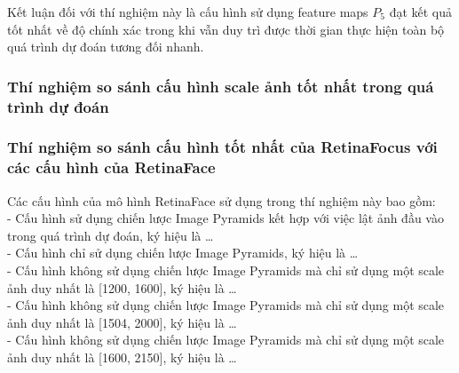 {    \noindent
    Kết luận đối với thí nghiệm này là cấu hình sử dụng feature maps  ${P}_{5}$ đạt kết quả tốt nhất về độ chính xác trong khi vẫn duy trì được thời gian thực hiện toàn bộ quá trình dự đoán tương đối nhanh.

    \subsubsection{Thí nghiệm so sánh cấu hình scale ảnh tốt nhất trong quá trình dự đoán}

    \subsubsection{Thí nghiệm so sánh cấu hình tốt nhất của RetinaFocus với các cấu hình của RetinaFace}
    Các cấu hình của mô hình RetinaFace sử dụng trong thí nghiệm này bao gồm: \\
    - Cấu hình sử dụng chiến lược Image Pyramids kết hợp với việc lật ảnh đầu vào trong quá trình dự đoán, ký hiệu là \dots \\
    - Cấu hình chỉ sử dụng chiến lược Image Pyramids, ký hiệu là \dots \\
    - Cấu hình không sử dụng chiến lược Image Pyramids mà chỉ sử dụng một scale ảnh duy nhất là [1200, 1600], ký hiệu là \dots \\
    - Cấu hình không sử dụng chiến lược Image Pyramids mà chỉ sử dụng một scale ảnh duy nhất là [1504, 2000], ký hiệu là \dots \\
    - Cấu hình không sử dụng chiến lược Image Pyramids mà chỉ sử dụng một scale ảnh duy nhất là [1600, 2150], ký hiệu là \dots \\

}
